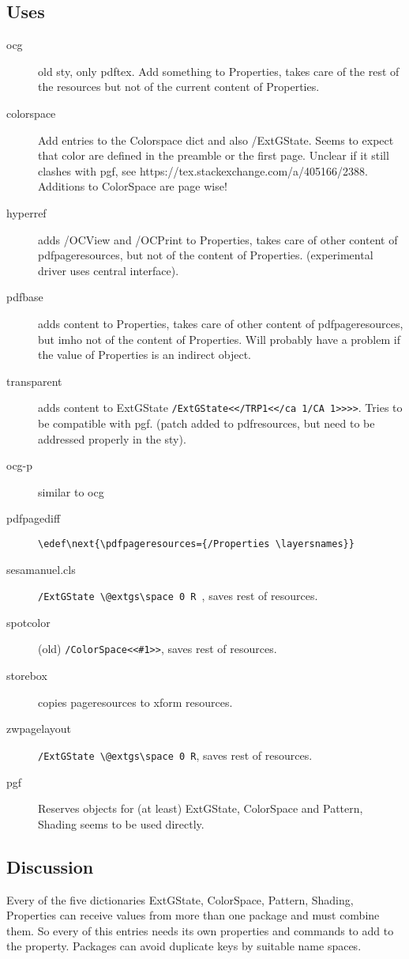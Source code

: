 \documentclass{article}
\begin{document}
\subsection{Uses}
\begin{description}
  \item[ocg] old sty, only pdftex. Add something to Properties, takes care of the rest of the resources but not of the current content of Properties.
  \item[colorspace] Add entries to the Colorspace dict and also /ExtGState. Seems to expect that color are defined in the preamble or the first page. Unclear if it still clashes with pgf, see https://tex.stackexchange.com/a/405166/2388. Additions to ColorSpace are page wise!
  \item[hyperref] adds /OCView and /OCPrint to Properties, takes care of other content of pdfpageresources, but not of the content of Properties. (experimental driver uses central interface).
  \item[pdfbase] adds content to Properties, takes care of other content of pdfpageresources, but imho not of the content of Properties. Will probably have a problem if the value of Properties is an indirect object.
  \item[transparent] adds content to ExtGState \verb+/ExtGState<</TRP1<</ca 1/CA 1>>>>+. Tries to be compatible with pgf. (patch added to pdfresources, but need to be addressed properly in the sty).
  \item[ocg-p] similar to ocg
  \item[pdfpagediff] \verb+\edef\next{\pdfpageresources={/Properties \layersnames}}+
  \item[sesamanuel.cls] \verb+/ExtGState \@extgs\space 0 R +, saves rest of resources.
  \item[spotcolor] (old) \verb+/ColorSpace<<#1>>+, saves rest of resources.
  \item[storebox] copies pageresources to xform resources.
  \item[zwpagelayout] \verb+/ExtGState \@extgs\space 0 R+, saves rest of resources.
  \item[pgf] Reserves objects for (at least) ExtGState, ColorSpace and Pattern, Shading seems to be used directly.
\end{description}

\subsection{Discussion}
Every of the five dictionaries ExtGState, ColorSpace, Pattern, Shading, Properties can receive values from more than one package and must combine them. So every of this entries needs its own properties and commands to add to the property. Packages can avoid duplicate keys by suitable name spaces.
\end{document}

